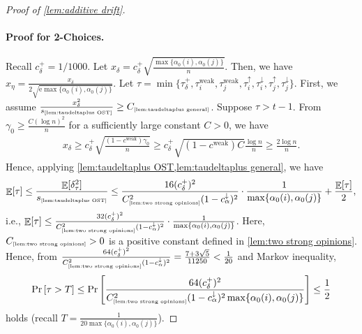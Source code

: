 \documentclass[letterpaper,11pt]{article}
\DeclareMathOperator*{\E}{\mathbb{E}}
\newcommand{\e}{\mathrm{e}}
\newcommand{\constref}[1]{C_{\mbox{\tiny\ref{#1}}}}
\newcommand{\varianceref}[1]{\variance_{\mbox{\tiny\ref{#1}}}}
\newcommand{\alphanorm}{\gamma}
\newcommand{\taudeltaplus}{\tau^{+}_\delta}
\newcommand{\cweak}{c^{\mathrm{weak}}}
\newcommand{\calphadown}{c^{\downarrow}_\alpha}
\newcommand{\cdeltaplus}{c^{+}_\delta}
\newcommand{\variance}{s}
\newcommand{\tauiup}{\tau^{\uparrow}_i}
\newcommand{\tauidown}{\tau^{\downarrow}_i}
\newcommand{\tauiweak}{\tau^{\mathrm{weak}}_i}
\newcommand{\taujweak}{\tau^{\mathrm{weak}}_j}
\newcommand{\taujup}{\tau^{\uparrow}_j}
\newcommand{\taujdown}{\tau^{\downarrow}_j}
\newcommand{\xdelta}{x_{\delta}}
\newcommand{\xeta}{x_{\eta}}
\newcommand{\Cnorminitial}{C_{\alphanorm}}
\begin{document}
\begin{proof}[Proof of \cref{lem:additive drift}]
\paragraph*{Proof for 2-Choices.}
  Recall $\cdeltaplus=1/1000$.
  Let $\xdelta=\cdeltaplus\sqrt{\frac{\max\{\alpha_0(i),\alpha_0(j)\}}{n}}$.
  Then, we have $\xeta=\frac{\xdelta}{2\sqrt{\e \max\{\alpha_0(i),\alpha_0(j)\}}}$.
  Let $\tau=\min\{\taudeltaplus,\tauiweak,\taujweak,\tauiup,\tauidown,\taujup,\taujdown\}$.
  First, we assume $\frac{\xdelta^2}{\varianceref{lem:taudeltaplus OST}}\geq \constref{lem:taudeltaplus general}$.
  Suppose $\tau>t-1$.
  From $\alphanorm_0\geq \frac{C(\log n)^2}{n}$ for a sufficiently large constant $C>0$, we have
  \begin{align*}
    \xdelta\geq \cdeltaplus \sqrt{\frac{(1-\cweak)\alphanorm_0}{n}}
    \geq \cdeltaplus \sqrt{(1-\cweak)C}\frac{\log n}{n}
    \geq \frac{2\log n}{n}.
  \end{align*}
    Hence, applying \cref{lem:taudeltaplus OST,lem:taudeltaplus general}, we have
    \begin{align*}
      \E[\tau]\leq \frac{\E[\delta_\tau^2]}{\varianceref{lem:taudeltaplus OST}}\leq \frac{16(\cdeltaplus)^2}{\constref{lem:two strong opinions}^2(1-\calphadown)^2}\cdot \frac{1}{\max\{\alpha_0(i),\alpha_0(j)\}}+\frac{\E[\tau]}{2},
    \end{align*}
    i.e., $\E[\tau]\leq \frac{32(\cdeltaplus)^2}{\constref{lem:two strong opinions}^2(1-\calphadown)^2}\cdot \frac{1}{\max\{\alpha_0(i),\alpha_0(j)\}}$. 
    Here, $\constref{lem:two strong opinions}>0$ is a positive constant defined in \cref{lem:two strong opinions}.
    Hence, from $\frac{64(\cdeltaplus)^2}{\constref{lem:two strong opinions}^2(1-\calphadown)^2}=\frac{7+3\sqrt{5}}{11250} <\frac{1}{20}$ and Markov inequality,
    \begin{align}
      \Pr\qty[\tau>T]\leq 
      \Pr\qty[\frac{64(\cdeltaplus)^2}{\constref{lem:two strong opinions}^2(1-\calphadown)^2\max\{\alpha_0(i),\alpha_0(j)\}}]
      \leq \frac{1}{2} \label{eq:taudeltaplus case1 2choices}
    \end{align}
    holds (recall $T=\frac{1}{20\max\{\alpha_0(i),\alpha_0(j)\}}$).   
   

\end{proof}
\end{document}
